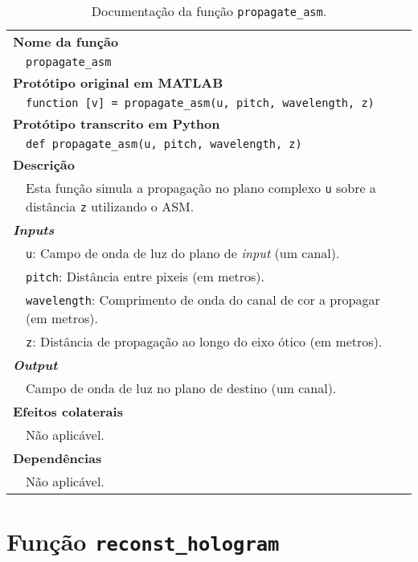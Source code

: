 \begin{table}[!hp]
    \centering
    \caption{Documentação da função \texttt{propagate\_asm}.}
    \label{tab:propagate_asm}
    \begin{tabular}{p{1cm} p{11.5cm}}
        \hline
        \multicolumn{2}{l}{\bfseries\small Nome da função}\\
         & \verb|propagate_asm|\\
        \hline
        \multicolumn{2}{l}{\bfseries\small Protótipo original em MATLAB}\\
         & \texttt{function [v] = propagate_asm(u, pitch, wavelength, z)}\\
        \hline
        \multicolumn{2}{l}{\bfseries\small Protótipo transcrito em Python}\\
         & \texttt{def propagate_asm(u, pitch, wavelength, z)} \\
        \hline\multicolumn{2}{l}{\bfseries\small Descrição}\\
         & Esta função simula a propagação no plano complexo \verb|u| sobre a distância \verb|z| utilizando o \ac{ASM}.\\
        \hline\multicolumn{2}{l}{\bfseries\small \textit{Inputs}}\\
         & \verb|u|: Campo de onda de luz do plano de \textit{input} (um canal).\\
         & \verb|pitch|: Distância entre pixeis (em metros).\\
         & \verb|wavelength|: Comprimento de onda do canal de cor a propagar (em metros).\\
         & \verb|z|: Distância de propagação ao longo do eixo ótico (em metros).\\
        \hline\multicolumn{2}{l}{\bfseries\small \textit{Output}}\\
         & Campo de onda de luz no plano de destino (um canal).\\
        \hline\multicolumn{2}{l}{\bfseries\small Efeitos colaterais}\\
         & Não aplicável. \\
        \hline\multicolumn{2}{l}{\bfseries\small Dependências}\\
         & Não aplicável. \\
        \hline
    \end{tabular}
\end{table}


\newpage
\section{Função \texttt{reconst\_hologram}}
\label{sec::doc-codigo:reconst_hologram}

